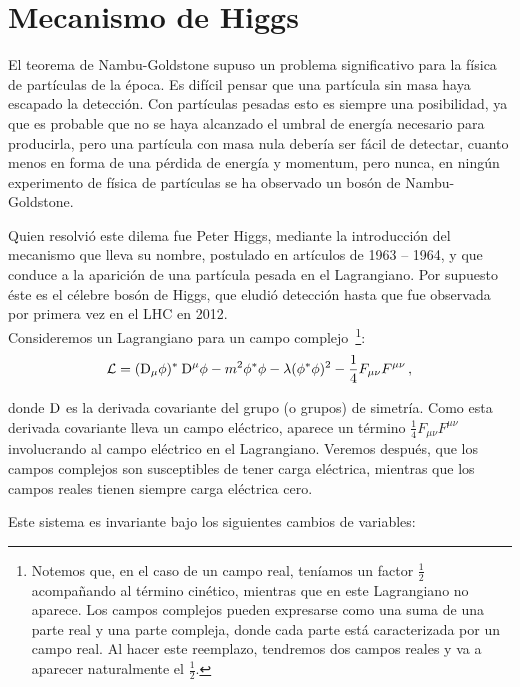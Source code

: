 \section{Mecanismo de Higgs}

El teorema de Nambu-Goldstone supuso un problema significativo para la física de partículas de la época. Es difícil pensar que una partícula sin masa haya escapado la detección. Con partículas pesadas esto es siempre una posibilidad, ya que es probable que no se haya alcanzado el umbral de energía necesario para producirla, pero una partícula con masa nula debería ser fácil de detectar, cuanto menos en forma de una pérdida de energía y momentum, pero nunca, en ningún experimento de física de partículas se ha observado un bosón de Nambu-Goldstone.

Quien resolvió este dilema fue Peter Higgs, mediante la introducción del mecanismo que lleva su nombre, postulado en artículos de 1963 -- 1964, y que conduce a la aparición de una partícula pesada en el Lagrangiano. Por supuesto éste es el célebre bosón de Higgs, que eludió detección hasta que fue observada por primera vez en el LHC en 2012.\\


Consideremos un Lagrangiano para un campo complejo~\footnote{Notemos que, en el caso de un campo real, teníamos un factor $\frac{1}{2}$ acompañando al término cinético, mientras que en este Lagrangiano no aparece. Los campos complejos pueden expresarse como una suma de una parte real y una parte compleja, donde cada parte está caracterizada por un campo real. Al hacer este reemplazo, tendremos dos campos reales y va a aparecer naturalmente el $\frac{1}{2}$.}:
%
\begin{equation}
    \mathcal{L} = (\mathrm{D}_{\mu} \phi)^{*}\> \mathrm{D}^\mu \phi - m^2 \phi^{*} \phi - \lambda (\phi^{*} \phi)^2 - \frac{1}{4} F_{\mu \nu} F^{\mu \nu} \,,
\end{equation}

\noindent donde $\mathrm{D}$ es la derivada covariante del grupo (o grupos) de simetría. Como esta derivada covariante lleva un campo eléctrico, aparece un término $\frac{1}{4}F_{\mu\nu}F^{\mu\nu}$ involucrando al campo eléctrico en el Lagrangiano. Veremos después, que los campos complejos son susceptibles de tener carga eléctrica, mientras que los campos reales tienen siempre carga eléctrica cero.



Este sistema es invariante bajo los siguientes cambios de variables:

